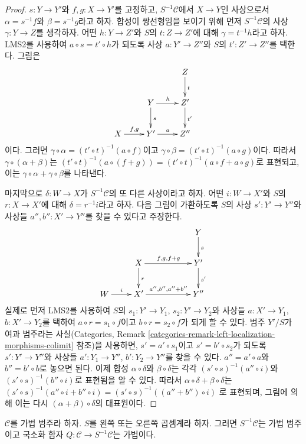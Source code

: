 \begin{proof}
\medskip\noindent
$s : Y \to Y'$와 $f, g : X \to Y'$를 고정하고,
$S^{-1}\mathcal{C}$에서 $X \to Y$인 사상으로서
$\alpha = s^{-1}f$와 $\beta = s^{-1}g$라고 하자.
합성이 쌍선형임을 보이기 위해 먼저 $S^{-1}\mathcal{C}$의 사상
$\gamma : Y \to Z$를 생각하자. 어떤 $h : Y \to Z'$와
$S$의 $t : Z \to Z'$에 대해 $\gamma = t^{-1}h$라고 하자.
LMS2를 사용하여 $a \circ s = t' \circ h$가 되도록 사상
$a : Y' \to Z''$와 $S$의 $t' : Z' \to Z''$를 택한다. 그림은
$$
\xymatrix{
& & Z \ar[d]^t \\
& Y \ar[r]^h \ar[d]^s & Z' \ar[d]^{t'} \\
X \ar[r]^{f, g} & Y' \ar[r]^a & Z''
}
$$
이다. 그러면
$\gamma \circ \alpha = (t' \circ t)^{-1}(a \circ f)$이고
$\gamma \circ \beta = (t' \circ t)^{-1}(a \circ g)$이다.
따라서 $\gamma \circ (\alpha + \beta)$는
$(t' \circ t)^{-1}(a \circ (f + g)) =
(t' \circ t)^{-1}(a \circ f + a \circ g)$로 표현되고, 이는
$\gamma \circ \alpha + \gamma \circ \beta$를 나타낸다.

\medskip\noindent
마지막으로 $\delta : W \to X$가 $S^{-1}\mathcal{C}$의 또 다른
사상이라고 하자. 어떤 $i : W \to X'$와 $S$의 $r : X \to X'$에 대해
$\delta = r^{-1}i$라고 하자. 다음 그림이 가환하도록 $S$의 사상
$s' : Y' \to Y''$와 사상들 $a'', b'' : X' \to Y''$를 찾을 수 있다고
주장한다.
$$
\xymatrix{
& & & Y \ar[d]^s \\
& X \ar[rr]^{f, g, f + g} \ar[d]^r & & Y' \ar[d]^{s'} \\
W \ar[r]^i & X' \ar[rr]^{a'', b'', a'' + b''} & & Y''
}
$$
실제로 먼저 LMS2를 사용하여 $S$의
$s_1 : Y' \to Y_1$, $s_2 : Y' \to Y_2$와 사상들
$a : X' \to Y_1$, $b : X' \to Y_2$를 택하여
$a \circ r = s_1 \circ f$이고 $b \circ r = s_2 \circ f$가 되게 할 수
있다. 범주 $Y'/S$가 여과 범주라는 사실(Categories, Remark
\ref{categories-remark-left-localization-morphisms-colimit} 참조)을
사용하면, $s' = a' \circ s_1$이고 $s' = b' \circ s_2$가 되도록
$s' : Y' \to Y''$와 사상들 $a' : Y_1 \to Y''$, $b' : Y_2 \to Y''$를
찾을 수 있다. $a'' = a' \circ a$와 $b'' = b' \circ b$로 놓으면 된다.
이제 합성 $\alpha \circ \delta$와 $\beta \circ \delta$는 각각
$(s' \circ s)^{-1}(a'' \circ i)$와
$(s' \circ s)^{-1}(b'' \circ i)$로 표현됨을 알 수 있다.
따라서 $\alpha \circ \delta + \beta \circ \delta$는
$(s' \circ s)^{-1}(a'' \circ i + b'' \circ i) =
(s' \circ s)^{-1}((a'' + b'') \circ i)$
로 표현되며, 그림에 의해 이는 다시
$(\alpha + \beta) \circ \delta$의 대표원이다.
\end{proof}

\begin{lemma}
\label{lemma-localization-additive}
$\mathcal{C}$를 가법 범주라 하자.
$S$를 왼쪽 또는 오른쪽 곱셈계라 하자.
그러면 $S^{-1}\mathcal{C}$는 가법 범주이고 국소화 함자
$Q : \mathcal{C} \to S^{-1}\mathcal{C}$는 가법이다.
\end{lemma}

